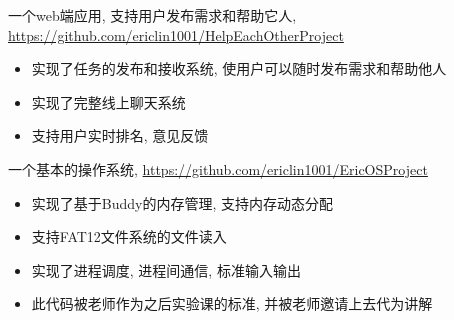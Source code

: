 \documentclass{resume}
\begin{document}

一个web端应用, 支持用户发布需求和帮助它人, \url{https://github.com/ericlin1001/HelpEachOtherProject}
\begin{itemize}
	\item 实现了任务的发布和接收系统, 使用户可以随时发布需求和帮助他人	

	\item 实现了完整线上聊天系统
	\item 支持用户实时排名, 意见反馈
\end{itemize}

一个基本的操作系统, \url{https://github.com/ericlin1001/EricOSProject}
\begin{itemize}
	\item 实现了基于Buddy的内存管理, 支持内存动态分配 
	\item 支持FAT12文件系统的文件读入
	\item 实现了进程调度, 进程间通信, 标准输入输出
	\item 此代码被老师作为之后实验课的标准, 并被老师邀请上去代为讲解
\end{itemize}
\end{document}
